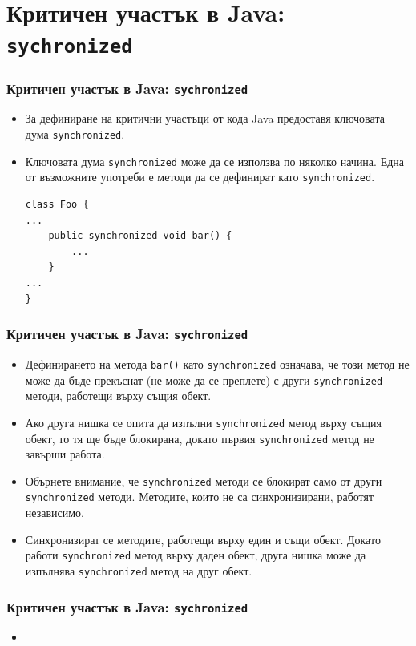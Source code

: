 \documentclass[ignorenonframetext, hyperref=unicode,compress]{beamer}
\begin{document}
\section{Критичен участък в Java: \lstinline{sychronized}}
\begin{frame}[containsverbatim]
\frametitle{Критичен участък в Java: \lstinline{sychronized}}
\begin{itemize}
\item За дефиниране на критични участъци от
кода Java предоставя ключовата дума \lstinline{synchronized}.
\item Ключовата дума \lstinline{synchronized} може да се използва по няколко
начина. Една от възможните употреби е методи да се дефинират като
\lstinline{synchronized}.
\begin{lstlisting}
class Foo {
...
	public synchronized void bar() {
		...
	} 
...
}
\end{lstlisting}
\end{itemize}
\end{frame}

\begin{frame}[containsverbatim]
\frametitle{Критичен участък в Java: \lstinline{sychronized}}
\begin{itemize}
\item Дефинирането на метода \lstinline{bar()} като \lstinline{synchronized}
означава, че този метод не може да бъде прекъснат (не може да се преплете) с
други \lstinline{synchronized} методи, работещи върху същия обект.
\item Ако друга нишка се опита да изпълни \lstinline{synchronized} метод
върху същия обект, то тя ще бъде блокирана, докато първия
\lstinline{synchronized} метод не завърши работа.
\item Обърнете внимание, че \lstinline{synchronized} методи се блокират само от 
други \lstinline{synchronized} методи. Методите, които не са синхронизирани,
работят независимо.
\item Синхронизират се методите, работещи върху един и същи обект. Докато
работи \lstinline{synchronized} метод върху даден обект, друга нишка може да
изпълнява \lstinline{synchronized} метод на друг обект.
\end{itemize}
\end{frame}

\begin{frame}[containsverbatim]
\frametitle{Критичен участък в Java: \lstinline{sychronized}}
\begin{itemize}
\item 
\end{itemize}
\end{frame}
\end{document}
